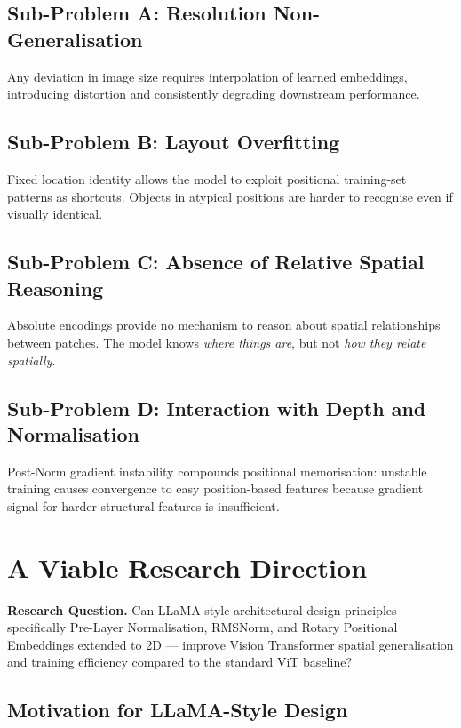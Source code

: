 \documentclass[12pt,a4paper]{article}
\begin{document}
\subsection{Sub-Problem A: Resolution Non-Generalisation}
Any deviation in image size requires interpolation of learned embeddings,
introducing distortion and consistently degrading downstream performance.

\subsection{Sub-Problem B: Layout Overfitting}
Fixed location identity allows the model to exploit positional training-set
patterns as shortcuts. Objects in atypical positions are harder to recognise
even if visually identical.

\subsection{Sub-Problem C: Absence of Relative Spatial Reasoning}
Absolute encodings provide no mechanism to reason about spatial relationships
between patches. The model knows \emph{where things are}, but not \emph{how
they relate spatially}.

\subsection{Sub-Problem D: Interaction with Depth and Normalisation}
Post-Norm gradient instability compounds positional memorisation: unstable
training causes convergence to easy position-based features because gradient
signal for harder structural features is insufficient.

\section{A Viable Research Direction}
\label{sec:direction}

\begin{callout}
  \textbf{Research Question.} Can LLaMA-style architectural design principles
  --- specifically Pre-Layer Normalisation, RMSNorm, and Rotary Positional
  Embeddings extended to 2D --- improve Vision Transformer spatial
  generalisation and training efficiency compared to the standard ViT baseline?
\end{callout}

\subsection{Motivation for LLaMA-Style Design}
\end{document}
